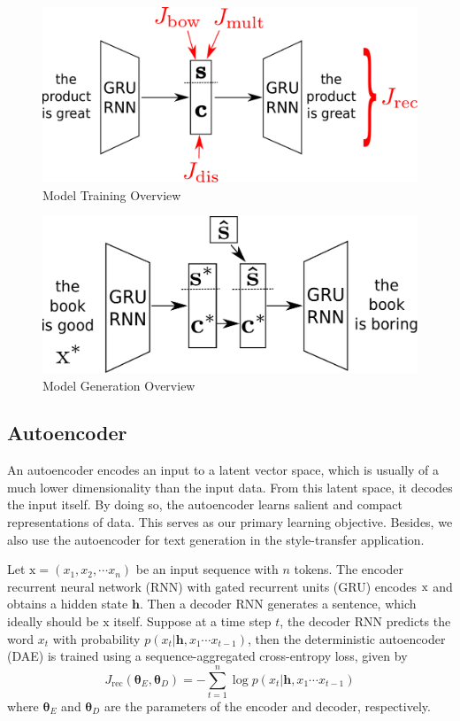 \documentclass[letterpaper]{article} %
\newcommand{\rmx}{\mathrm x}
\newcommand{\loss}[1]{J_\text{#1}}
\begin{document}
\begin{figure}[ht]
	\centering
	\includegraphics[width=0.8\linewidth]{model-overview-training}
	\caption{Model Training Overview}
	\label{fig:model-training-overview}
\end{figure}
\begin{figure}[ht]
	\centering
	\includegraphics[width=0.8\linewidth]{model-overview-inference}
	\caption{Model Generation Overview}
	\label{fig:model-inference-overview}
\end{figure}

\subsection{Autoencoder} \label{ssec:seq2seq-autoencoder}

An autoencoder encodes an input to a latent vector space, which is usually of a much lower dimensionality than the input data. From this latent space, it decodes the input itself. By doing so, the autoencoder learns salient and compact representations of data. This serves as our primary learning objective. Besides, we also use the autoencoder for text generation in the style-transfer application.

Let $\rmx=(x_1, x_2, \cdots x_n)$ be an input sequence with $n$ tokens. The encoder recurrent neural network (RNN) with gated recurrent units (GRU) \cite{cho2014learning} encodes $\rm x$ and obtains a hidden state $\bm h$. Then a decoder RNN generates a sentence, which ideally should be $\rmx$ itself. Suppose at a time step $t$, the decoder RNN predicts the word $x_t$ with probability $p(x_t|\bm h, x_1\cdots x_{t-1})$, then the deterministic autoencoder (DAE) is trained using a sequence-aggregated cross-entropy loss, given by
\begin{equation}
	\loss{rec}(\bm\theta_E,\bm\theta_D)= -\sum_{t=1}^n \log p(x_t|\bm h, x_1\cdots x_{t-1})
\end{equation}
where $\bm\theta_E$ and $\bm\theta_D$ are the parameters of the encoder and decoder, respectively.
\end{document}
